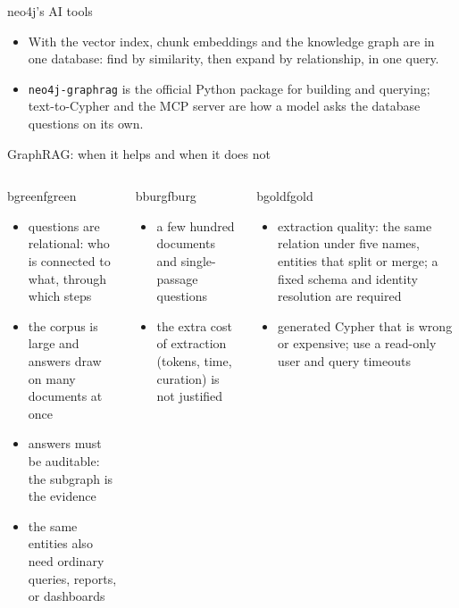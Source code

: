 \documentclass[aspectratio=169, 10pt]{beamer}
\begin{document}
\begin{frame}[fragile]{neo4j's AI tools}
\begin{center}
  \end{center}
  \vspace{0.1cm}
  \small
  \begin{itemize}
    \item With the vector index, chunk embeddings and the knowledge graph are in one database: find by similarity, then expand by relationship, in one query.
    \item \texttt{neo4j-graphrag} is the official Python package for building and querying; text-to-Cypher and the MCP server are how a model asks the database questions on its own.
  \end{itemize}
\end{frame}

\begin{frame}[fragile]{GraphRAG: when it helps and when it does not}
  \vspace{0.3cm}
  \begin{columns}[T]
      \begin{tbox}{bgreen}{fgreen}
        \begin{itemize}
          \item questions are relational: who is connected to what, through which steps
          \item the corpus is large and answers draw on many documents at once
          \item answers must be auditable: the subgraph is the evidence
          \item the same entities also need ordinary queries, reports, or dashboards
        \end{itemize}
      \end{tbox}
      \begin{tbox}{bburg}{fburg}
        \begin{itemize}
          \item a few hundred documents and single-passage questions
          \item the extra cost of extraction (tokens, time, curation) is not justified
        \end{itemize}
      \end{tbox}
      \begin{tbox}{bgold}{fgold}
        \begin{itemize}
          \item extraction quality: the same relation under five names, entities that split or merge; a fixed schema and identity resolution are required
          \item generated Cypher that is wrong or expensive; use a read-only user and query timeouts
        \end{itemize}
      \end{tbox}
  \end{columns}
\end{frame}
\end{document}
